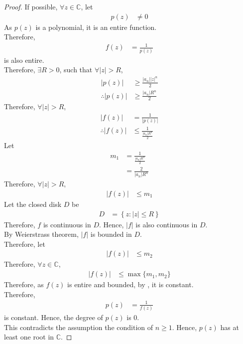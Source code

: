 \documentclass[titlepage, fleqn, a4paper, 12pt, twoside]{article}
\theoremstyle{definition}
\theoremstyle{theorem}
\begin{document}
\begin{proof}
	If possible, $\forall z \in \mathbb{C}$, let
	\begin{align*}
		p(z) & \neq 0
	\end{align*}
	As $p(z)$ is a polynomial, it is an entire function.\\
	Therefore,
	\begin{align*}
		f(z) & = \frac{1}{p(z)}
	\end{align*}
	is also entire.\\
	Therefore, $\exists R > 0$, such that $\forall |z| > R$,
	\begin{align*}
		\left| p(z) \right|            & \ge \frac{|a_n| |z|^n}{2} \\
		\therefore \left| p(z) \right| & \ge \frac{|a_n| R^n}{2}
	\end{align*}
	Therefore, $\forall |z| > R$,
	\begin{align*}
		\left| f(z) \right|            & = \frac{1}{\left| p(z) \right|} \\
		\therefore \left| f(z) \right| & \le \frac{1}{\frac{|a_n| R^n}{2}}
	\end{align*}
	Let
	\begin{align*}
		m_1 & = \frac{1}{\frac{|a_n| R^n}{2}} \\
                    & = \frac{2}{|a_n| R^n}
	\end{align*}
	Therefore, $\forall |z| > R$,
	\begin{align*}
		\left| f(z) \right| & \le m_1
	\end{align*}
	Let the closed disk $D$ be
	\begin{align*}
		D & = \left\{ z : |z| \le R \right\}
	\end{align*}
	Therefore, $f$ is continuous in $D$.
	Hence, $|f|$ is also continuous in $D$.\\
	By Weierstrass theorem, $|f|$ is bounded in $D$.\\
	Therefore, let
	\begin{align*}
		\left| f(z) \right| & \le m_2
	\end{align*}
	Therefore, $\forall z \in \mathbb{C}$,
	\begin{align*}
		\left| f(z) \right| & \le \max\{m_1,m_2\}
	\end{align*}
	Therefore, as $f(z)$ is entire and bounded, by , it is constant.\\
	Therefore,
	\begin{align*}
		p(z) & = \frac{1}{f(z)}
	\end{align*}
	is constant. Hence, the degree of $p(z)$ is $0$.\\
	This contradicts the assumption the condition of $n \ge 1$.
	Hence, $p(z)$ has at least one root in $\mathbb{C}$.
\end{proof}
\end{document}
